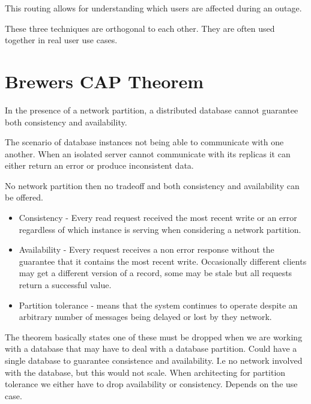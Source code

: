 This routing allows for understanding which users are affected during an outage.

\begin{note}
    These three techniques are orthogonal to each other.
    They are often used together in real user use cases.
\end{note}


\section{Brewers CAP Theorem}

\begin{note}
    In the presence of a network partition, a distributed database cannot guarantee both consistency and availability.
\end{note}

The scenario of database instances not being able to communicate with one another.
When an isolated server cannot communicate with its replicas it can either return an error or produce inconsistent data.

\begin{note}
    No network partition then no tradeoff and both consistency and availability can be offered.
\end{note}

\begin{itemize}
    \item Consistency - Every read request received the most recent write or an error regardless of which instance is serving when considering a network partition.
    \item Availability - Every request receives a non error response without the guarantee that it contains the most recent write.
    Occasionally different clients may get a different version of a record, some may be stale but all requests return a successful value.
    \item Partition tolerance - means that the system continues to operate despite an arbitrary number of messages being delayed or lost by they network.
\end{itemize}

The theorem basically states one of these must be dropped when we are working with a database that may have to deal with a database partition.
Could have a single database to guarantee consistence and availability. I.e no network involved with the database, but this would not scale.
When architecting for partition tolerance we either have to drop availability or consistency.
Depends on the use case.

